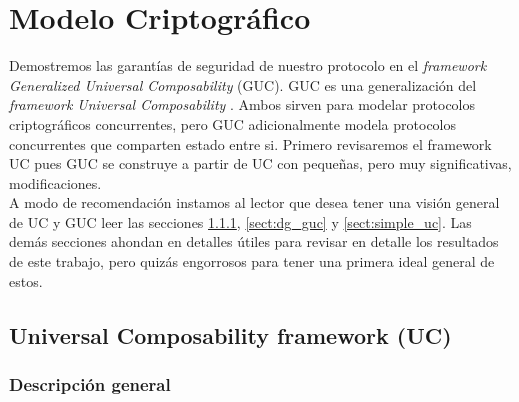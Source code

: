 \chapter{Modelo Criptográfico}

Demostremos las garantías de seguridad de nuestro protocolo en el
\textit{framework Generalized Universal Composability} (GUC). GUC \cite{conf/tcc/CanettiDPW07}
es una generalización del \textit{framework Universal Composability}
\cite{conf/focs/Canetti01}. Ambos sirven para modelar protocolos criptográficos concurrentes,
pero GUC adicionalmente modela protocolos concurrentes que comparten estado entre si.
Primero revisaremos el framework UC pues GUC se construye a partir de UC con pequeñas,
pero muy significativas, modificaciones.\\
A modo de recomendación instamos al lector que desea tener una visión general de UC y GUC
leer las secciones \ref{sect:dg_uc}, \ref{sect:dg_guc} y \ref{sect:simple_uc}. Las demás
secciones ahondan en detalles útiles para revisar en detalle los resultados de este trabajo,
pero quizás engorrosos para tener una primera ideal general de estos.

\section{Universal Composability framework (UC)}
\label{sect:uc}
\subsection{Descripción general}
\label{sect:dg_uc}

